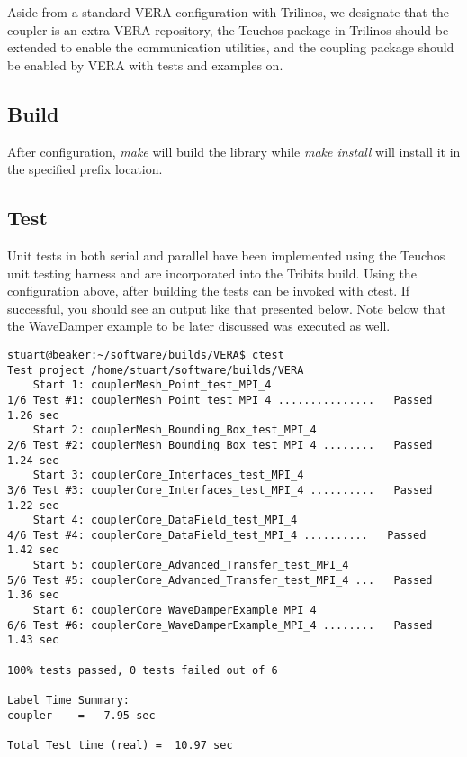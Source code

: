 \documentclass[letterpaper]{article}
\begin{document}
Aside from a standard VERA configuration with Trilinos, we designate
that the coupler is an extra VERA repository, the Teuchos package in
Trilinos should be extended to enable the communication utilities, and
the coupling package should be enabled by VERA with tests and examples
on.

\subsection{Build}

After configuration, {\sl make} will build the library while {\sl make
  install} will install it in the specified prefix location.

\subsection{Test}
Unit tests in both serial and parallel have been implemented using the
Teuchos unit testing harness and are incorporated into the Tribits
build. Using the configuration above, after building the tests can be
invoked with ctest. If successful, you should see an output like that
presented below. Note below that the WaveDamper example to be later
discussed was executed as well.

\begin{verbatim}
stuart@beaker:~/software/builds/VERA$ ctest
Test project /home/stuart/software/builds/VERA
    Start 1: couplerMesh_Point_test_MPI_4
1/6 Test #1: couplerMesh_Point_test_MPI_4 ...............   Passed    1.26 sec
    Start 2: couplerMesh_Bounding_Box_test_MPI_4
2/6 Test #2: couplerMesh_Bounding_Box_test_MPI_4 ........   Passed    1.24 sec
    Start 3: couplerCore_Interfaces_test_MPI_4
3/6 Test #3: couplerCore_Interfaces_test_MPI_4 ..........   Passed    1.22 sec
    Start 4: couplerCore_DataField_test_MPI_4
4/6 Test #4: couplerCore_DataField_test_MPI_4 ..........   Passed    1.42 sec
    Start 5: couplerCore_Advanced_Transfer_test_MPI_4
5/6 Test #5: couplerCore_Advanced_Transfer_test_MPI_4 ...   Passed    1.36 sec
    Start 6: couplerCore_WaveDamperExample_MPI_4
6/6 Test #6: couplerCore_WaveDamperExample_MPI_4 ........   Passed    1.43 sec

100% tests passed, 0 tests failed out of 6

Label Time Summary:
coupler    =   7.95 sec

Total Test time (real) =  10.97 sec
\end{verbatim}
\end{document}
